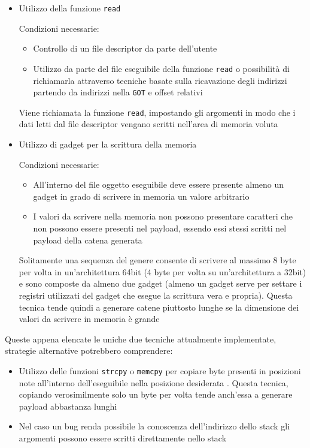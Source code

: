 \begin{itemize}

\item  Utilizzo della funzione \lstinline{read}

  Condizioni necessarie: 
  \begin{itemize}
   \item Controllo di un file descriptor da parte dell'utente
   \item Utilizzo da parte del file eseguibile della funzione
     \lstinline{read} o possibilità di richiamarla attraverso tecniche
     basate sulla ricavazione degli indirizzi partendo da indirizzi
     nella \lstinline{GOT} e offset relativi
  \end{itemize}

  Viene richiamata la funzione \lstinline{read}, impostando gli
  argomenti in modo che i dati letti dal file descriptor vengano
  scritti nell'area di memoria voluta

\item Utilizzo di gadget per la scrittura della memoria

  Condizioni necessarie:
  \begin{itemize}

    \item All'interno del file oggetto eseguibile deve essere presente
      almeno un gadget in grado di scrivere in memoria un valore
      arbitrario

    \item I valori da scrivere nella memoria non possono presentare
      caratteri che non possono essere presenti nel payload, essendo
      essi stessi scritti nel payload della catena generata

  \end{itemize}
  Solitamente una sequenza del genere consente di scrivere al massimo
  8 byte per volta in un'architettura 64bit (4 byte per volta su
  un'architettura a 32bit) e sono composte da almeno due gadget
  (almeno un gadget serve per settare i registri utilizzati del gadget
  che esegue la scrittura vera e propria). Questa tecnica tende quindi
  a generare catene piuttosto lunghe se la dimensione dei valori da
  scrivere in memoria è grande

\end{itemize}

Queste appena elencate le uniche due tecniche attualmente implementate,
strategie alternative potrebbero comprendere:

\begin{itemize}

\item Utilizzo delle funzioni \lstinline{strcpy} o \lstinline{memcpy}
  per copiare byte presenti in posizioni note all'interno
  dell'eseguibile nella posizione desiderata
  \cite{roglia:2009}. Questa tecnica, copiando verosimilmente solo un
  byte per volta tende anch'essa a generare payload abbastanza lunghi

\item Nel caso un bug renda possibile la conoscenza dell'indirizzo
  dello stack gli argomenti possono essere scritti direttamente nello
  stack

\end{itemize}

